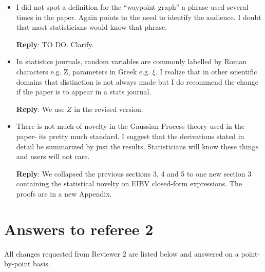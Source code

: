 \documentclass[a4paper]{article}
\newcounter{reviewer}
\def\reply{\textbf{Reply}}
\begin{document}
\begin{answers}
\begin{itemize}[noitemsep,topsep=0pt,parsep=0pt,partopsep=0pt]
\item I did not spot a definition for the “waypoint graph” a phrase used several times in the paper. Again points to the need to identify the audience. I doubt that most statisticians would know that phrase.\par
\reply: TO DO. Clarify. 
\vspace{1em}

\item In statistics journals, random variables are commonly labelled by Roman characters e.g. Z, parameters in Greek e.g. $\xi$. I realize that in other scientific domains that distinction is not always made but I do recommend the change if the paper is to appear in a stats journal.\par

\reply: We use $Z$ in the revised version.
\vspace{1em}

\item There is not much of novelty in the Gaussian Process theory used in the paper- its pretty much standard. I suggest that the derivations stated in detail be summarized by just the results. Statisticians will know these things and users will not care.\par
\reply: We collapsed the previous sections 3, 4 and 5 to one new section 3 containing the statistical novelty on EIBV closed-form expressions. The proofs are in a new Appendix.

\vspace{1em}

\end{itemize}

\end{answers}


\section*{Answers to referee 2}
All changes requested from Reviewer 2 are listed below and answered on a point-by-point basis.

\setcounter{reviewer}{2}
\end{document}
